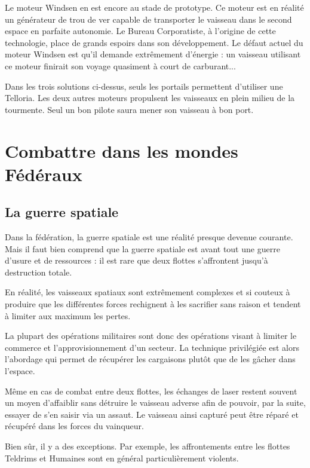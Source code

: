 \begin{multicols}{2}
Le moteur Windsen en est encore au stade de prototype. Ce moteur est en réalité un générateur de trou de ver capable de transporter le vaisseau dans le second espace en parfaite autonomie. Le Bureau Corporatiste, à l'origine de cette technologie, place de grands espoirs dans son développement. Le défaut actuel du moteur Windsen est qu'il demande extrêmement d'énergie : un vaisseau utilisant ce moteur finirait son voyage quasiment à court de carburant...


Dans les trois solutions ci-dessus, seuls les portails permettent d'utiliser une Telloria. Les deux autres moteurs propulsent les vaisseaux en plein milieu de la tourmente. Seul un bon pilote saura mener son vaisseau à bon port.

\end{multicols}

\chapter{Combattre dans les mondes Fédéraux}

\begin{multicols}{2}

\section{La guerre spatiale}

Dans la fédération, la guerre spatiale est une réalité presque devenue courante. Mais il faut bien comprend que la guerre spatiale est avant tout une guerre d’usure et de ressources : il est rare que deux flottes s’affrontent jusqu’à destruction totale.

En réalité, les vaisseaux spatiaux sont extrêmement complexes et si couteux à produire que les différentes forces rechignent à les sacrifier sans raison et tendent à limiter aux maximum les pertes.

La plupart des opérations militaires sont donc des opérations visant à limiter le commerce et l’approvisionnement d’un secteur. La technique privilégiée est alors l’abordage qui permet de récupérer les cargaisons plutôt que de les gâcher dans l’espace. 

Même en cas de combat entre deux flottes, les échanges de laser restent souvent un moyen d’affaiblir sans détruire le vaisseau adverse afin de pouvoir, par la suite, essayer de s’en saisir via un assaut. Le vaisseau ainsi capturé peut être réparé et récupéré dans les forces du vainqueur. 

Bien sûr, il y a des exceptions. Par exemple, les affrontements entre les flottes Teldrims et Humaines sont en général particulièrement violents.


\end{multicols}

